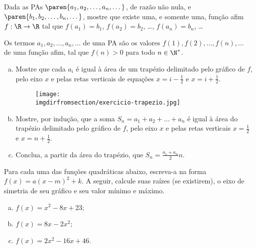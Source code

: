\begin{exercise}
    Dada as PAs $\paren{a_1, a_2, \dots, a_n, \dots}$, de razão não
nula, e $\paren{b_1, b_2, \dots, b_n, \dots}$, mostre que existe
uma, e somente uma, função afim $f: \R \to \R$ tal que $f(a_1) =
b_1$, $f(a_2) = b_2$, \dots , $f(a_n) = b_n$, \dots
\end{exercise}

\begin{exercise}
  Os termos $a_1, a_2, \dots, a_n, \dots$ de uma PA são os valores
  $f(1), f(2), \dots, f(n), \dots$ de uma função afim, tal que $f(n)
  >0$ para todo $n \in \N^\ast$.

  \begin{enumerate}[a)]
    \item Mostre que cada $a_i$ é igual à área de um trapézio
    delimitado pelo gráfico de $f$, pelo eixo $x$ e pelas retas
    verticais de equações $x=i - \frac 1 2 $ e $x = i + \frac 1 2$.
    
    \begin{figure}[H]
      \centering
      \texttt{[image: \\imgdirfromsection/exercicio-trapezio.jpg]}
      \label{fig:exercicio-trapezio}
    \end{figure}

    \item Mostre, por indução, que a soma $S_n = a_1+a_2+ \dots + a_n$ é igual à
    área do trapézio delimitado pelo gráfico de $f$, pelo eixo $x$ e
    pelas retas verticais $x= \frac 1 2$ e $x = n + \frac 1 2 $.
    \item Conclua, a partir da área do trapézio, que $S_n = \frac{a_1+a_n} 2 n$.
  \end{enumerate}
\end{exercise}

\begin{exercise}
    Para cada uma das funções quadráticas abaixo, escreva-a na forma
$f(x)=a(x-m)^2+k$. A seguir, calcule suas raízes (se existirem), o
eixo de simetria de seu gráfico e seu valor mínimo e máximo.
%
\begin{enumerate}[a)]
  \item $f(x) = x^2 -8x +23$;
  \item $f(x) = 8x - 2x^2$;
  \item $f(x) = 2x^2 - 16x +46$.
\end{enumerate}
\end{exercise}

